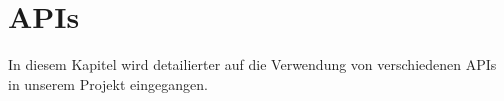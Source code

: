 \chapter{APIs}\label{ch:apis}
In diesem Kapitel wird detailierter auf die Verwendung von verschiedenen APIs in unserem Projekt
eingegangen.